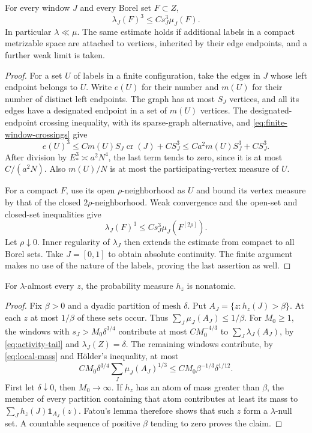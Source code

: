 \begin{lemma}\label{lem:edge-vertex-mass}
For every window $J$ and every Borel set $F\subset Z$,
\begin{equation}\label{eq:local-mass}
 \lambda_J(F)^3\le C s_J^3\mu_J(F).
\end{equation}
In particular $\lambda\ll\mu$.  The same estimate holds if additional
labels in a compact metrizable space are attached to vertices,
inherited by their edge endpoints, and a further weak limit is taken.
\end{lemma}
\begin{proof}
For a set $U$ of labels in a finite configuration, take the edges in
$J$ whose left endpoint belongs to $U$.  Write $e(U)$ for their number
and $m(U)$ for their number of distinct left endpoints.  The graph has
at most $S_J$ vertices, and all its edges have a designated endpoint
in a set of $m(U)$ vertices.  The designated-endpoint crossing
inequality, with its sparse-graph alternative, and
\eqref{eq:finite-window-crossings} give
\[
 e(U)^3\le C m(U)S_J\operatorname{cr}(J)+C S_J^3
       \le C a^2m(U)S_J^3+C S_J^3.
\]
After division by $E_*^3\asymp a^2N^4$, the last term tends to zero,
since it is at most $C/(a^2N)$.  Also $m(U)/N$ is at most the
participating-vertex measure of $U$.

For a compact $F$, use its open $\rho$-neighborhood as $U$ and bound
its vertex measure by that of the closed $2\rho$-neighborhood.
Weak convergence and the open-set and closed-set inequalities give
\[
 \lambda_J(F)^3\le C s_J^3\mu_J(F^{[2\rho]}).
\]
Let $\rho\downarrow0$.  Inner regularity of $\lambda_J$ then extends
the estimate from compact to all Borel sets.  Take $J=[0,1]$ to obtain
absolute continuity.  The finite argument makes no use of the nature
of the labels, proving the last assertion as well.
\end{proof}

\begin{lemma}\label{lem:nonatomic-time}
For $\lambda$-almost every $z$, the probability measure $h_z$ is
nonatomic.
\end{lemma}
\begin{proof}
Fix $\beta>0$ and a dyadic partition of mesh $\delta$.  Put
$A_J=\{z:h_z(J)>\beta\}$.  At each $z$ at most $1/\beta$ of these
sets occur.  Thus $\sum_J\mu_J(A_J)\le1/\beta$.
For $M_0\ge1$, the windows with $s_J>M_0\delta^{3/4}$ contribute at
most $C M_0^{-4/3}$ to $\sum_J\lambda_J(A_J)$, by
\eqref{eq:activity-tail} and $\lambda_J(Z)=\delta$.
The remaining windows contribute, by
\eqref{eq:local-mass} and H\"older's inequality, at most
\[
 C M_0\delta^{3/4}\sum_J\mu_J(A_J)^{1/3}
 \le C M_0\beta^{-1/3}\delta^{1/12}.
\]
First let $\delta\downarrow0$, then $M_0\to\infty$.
If $h_z$ has an atom of mass greater than $\beta$, the member of every
partition containing that atom contributes at least its mass to
$\sum_Jh_z(J)\mathbf1_{A_J}(z)$.  Fatou's lemma therefore shows that
such $z$ form a $\lambda$-null set.  A countable sequence of positive
$\beta$ tending to zero proves the claim.
\end{proof}

